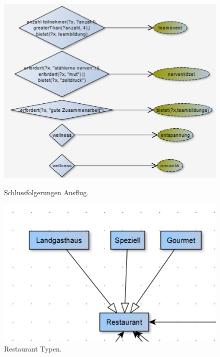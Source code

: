     \begin{figure}[H]%
        \begin{minipage}[hbt]{0,49\textwidth}
            \centering
            \includegraphics[scale=0.3]{bilder/AufbauAusflug.jpg}
            \caption*{Schlussfolgerungen Ausflug.\label{fig:AufbauAusflug}\protect\footnotemark[1]}
        \end{minipage}
        \begin{minipage}[hbt]{0,49\textwidth}
            \centering
            \includegraphics[scale=0.3]{bilder/AufbauRest.jpg}
            \caption*{Restaurant Typen.\label{fig:AufbauRest}\protect\footnotemark[1]}
        \end{minipage}
    \end{figure}

